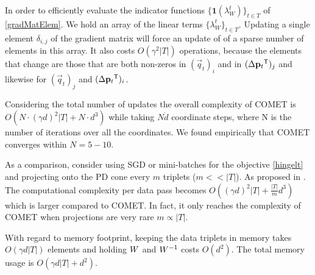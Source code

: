 \documentclass{article}
\begin{document}
In order to efficiently evaluate the indicator functions $\{ \textbf{1}(\lambda_{W}^t) \}_{t \in T}$ of \eqref{gradMatElem}. We hold an array of the linear terms $\{\lambda_{W}^t\}_{t \in T}$. Updating a single element $\delta_{i,j}$ of the gradient matrix will force an update of of a sparse number of elements in this array. It also costs $O(\gamma^2 |T|)$ operations, because the elements that change are those that are both non-zeros in $(\vec{q}_{t})_i$ and in $(\Delta\mathbf{p}_{t}{}^\mathsf{T})_j$ and likewise for $(\vec{q}_{t})_j$ and $(\Delta\mathbf{p}_{t}{}^\mathsf{T})_i$.

Considering the total number of updates 
the overall complexity of COMET is $O(N \cdot (\gamma d)^2 |T| + N \cdot d^3)$ while taking $N \dot d$ coordinate steps, where N is the number of iterations over all the coordinates. We found empirically that COMET converges within $N= 5 - 10$.

As a comparison, consider using SGD or mini-batches for the objective \eqref{hingelt} and projecting onto the PD cone every $m$ triplets ($m << |T|$). As proposed in \citet{OASIS,qian}.
The computational complexity per data pass becomes $O((\gamma d)^2 |T| + \frac{|T|}{m} d^3)$ which is larger compared to COMET. In fact, it only reaches the complexity of COMET when projections are very rare $m \propto |T|$.



With regard to memory footprint, keeping the data triplets in memory takes $O(\gamma d |T|)$ elements and holding ${W}$ and ${W}^{-1}$ costs $O(d^2)$. The total memory usage is $O(\gamma d |T| + d^2)$. %
\end{document}
